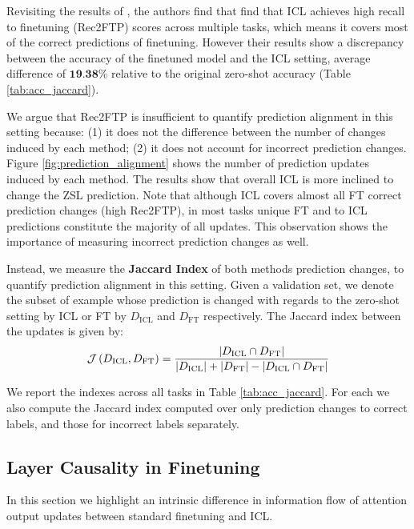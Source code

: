 Revisiting the results of \cite{dai2023gpt}, the authors find that find that ICL achieves high recall to finetuning (Rec2FTP) scores across multiple tasks, which means it covers most of the correct predictions of finetuning. 
However their results show a discrepancy between the accuracy of the finetuned model and the ICL setting, average difference of $\textbf{19.38\%}$ relative to the original zero-shot accuracy (Table \ref{tab:acc_jaccard}).


We argue that Rec2FTP is insufficient to quantify prediction alignment in this setting because:
(1) it does not the difference between the number of changes induced by each method;
(2) it does not account for incorrect prediction changes.
Figure \ref{fig:prediction_alignment} shows the number of prediction updates induced by each method.
The results show that overall ICL is more inclined to change the ZSL prediction.
Note that although ICL covers almost all FT correct prediction changes (high Rec2FTP), in most tasks unique FT and to ICL predictions constitute the majority of all updates.
This observation shows the importance of measuring incorrect prediction changes as well.

Instead, we measure the \textbf{Jaccard Index} of both methods prediction changes, to quantify prediction alignment in this setting.
Given a validation set, we denote the subset of example whose prediction is changed with regards to the zero-shot setting by ICL or FT by $D_\text{ICL}$ and $D_\text{FT}$ respectively.
The Jaccard index between the updates is given by: 
\begin{equation*}
  \mathcal{J}\left( D_\text{ICL}, D_\text{FT} \right) = \frac{\left|D_\text{ICL} \cap D_\text{FT}\right|}{\left|D_\text{ICL}\right| + \left|D_\text{FT}\right| - \left|D_\text{ICL} \cap D_\text{FT}\right|} 
\end{equation*}

We report the indexes across all tasks in Table \ref{tab:acc_jaccard}.
For each we also compute the Jaccard index computed over only prediction changes to correct labels, and those for incorrect labels separately.


\subsection{Layer Causality in Finetuning}
\label{sec:layer_causality}

In this section we highlight an intrinsic difference in information flow of attention output updates between standard finetuning and ICL.

